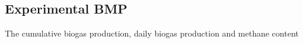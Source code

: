 \subsection{Experimental BMP}
The cumulative biogas production, daily biogas production and methane content 